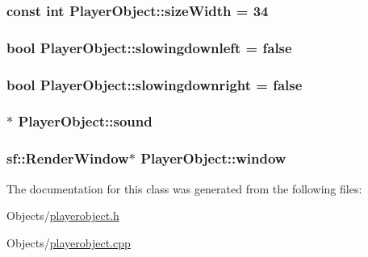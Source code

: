 \subsubsection[{\texorpdfstring{size\+Width}{sizeWidth}}]{\setlength{\rightskip}{0pt plus 5cm}const int Player\+Object\+::size\+Width = 34\hspace{0.3cm}{\ttfamily [protected]}}\hypertarget{classPlayerObject_a8c608e72f443704dcbbd2856c677d7ae}{}\label{classPlayerObject_a8c608e72f443704dcbbd2856c677d7ae}
\subsubsection[{\texorpdfstring{slowingdownleft}{slowingdownleft}}]{\setlength{\rightskip}{0pt plus 5cm}bool Player\+Object\+::slowingdownleft = false\hspace{0.3cm}{\ttfamily [protected]}}\hypertarget{classPlayerObject_a4894d3619cdf5cb0c35c480aa89502a4}{}\label{classPlayerObject_a4894d3619cdf5cb0c35c480aa89502a4}
\subsubsection[{\texorpdfstring{slowingdownright}{slowingdownright}}]{\setlength{\rightskip}{0pt plus 5cm}bool Player\+Object\+::slowingdownright = false\hspace{0.3cm}{\ttfamily [protected]}}\hypertarget{classPlayerObject_a3f5b7c904edac7e254297849659d01b3}{}\label{classPlayerObject_a3f5b7c904edac7e254297849659d01b3}
\subsubsection[{\texorpdfstring{sound}{sound}}]{$\ast$ Player\+Object\+::sound\hspace{0.3cm}{\ttfamily [protected]}}\hypertarget{classPlayerObject_a645addb4a01f3b4e4d67f9740b7c9963}{}\label{classPlayerObject_a645addb4a01f3b4e4d67f9740b7c9963}
\subsubsection[{\texorpdfstring{window}{window}}]{\setlength{\rightskip}{0pt plus 5cm}sf\+::\+Render\+Window$\ast$ Player\+Object\+::window\hspace{0.3cm}{\ttfamily [protected]}}\hypertarget{classPlayerObject_aed44bc97791e54cd2169f508699fa311}{}\label{classPlayerObject_aed44bc97791e54cd2169f508699fa311}


The documentation for this class was generated from the following files\+:\begin{DoxyCompactItemize}
\item 
Objects/\hyperlink{playerobject_8h}{playerobject.\+h}\item 
Objects/\hyperlink{playerobject_8cpp}{playerobject.\+cpp}\end{DoxyCompactItemize}
